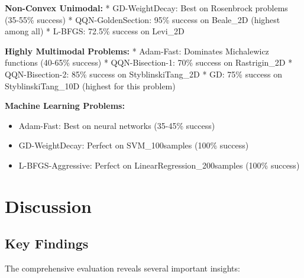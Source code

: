 \textbf{Non-Convex Unimodal:}
* GD-WeightDecay: Best on Rosenbrock problems (35-55\% success)
* QQN-GoldenSection: 95\% success on Beale\_2D (highest among all)
* L-BFGS: 72.5\% success on Levi\_2D

\textbf{Highly Multimodal Problems:}
* Adam-Fast: Dominates Michalewicz functions (40-65\% success)
* QQN-Bisection-1: 70\% success on Rastrigin\_2D
* QQN-Bisection-2: 85\% success on StyblinskiTang\_2D
* GD: 75\% success on StyblinskiTang\_10D (highest for this problem)

\textbf{Machine Learning Problems:}

\begin{itemize}
\tightlist
\item
  Adam-Fast: Best on neural networks (35-45\% success)
\item
  GD-WeightDecay: Perfect on SVM\_100samples (100\% success)
\item
  L-BFGS-Aggressive: Perfect on LinearRegression\_200samples (100\% success)
\end{itemize}

\hypertarget{discussion}{%
\section{Discussion}\label{discussion}}

\hypertarget{key-findings}{%
\subsection{Key Findings}\label{key-findings}}

The comprehensive evaluation reveals several important insights:


